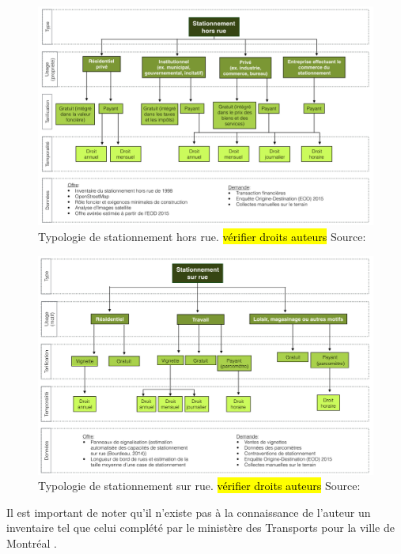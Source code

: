 \begin{figure}[ht]
    \centering
    \includegraphics[width=1.0\textwidth]{images/Typologie_Stationnement_hors_rue.png}
    \caption{Typologie de stationnement hors rue. \hl{vérifier droits auteurs} Source: \cite{Morency:StationnementDans:2017}}
    \label{fig:Typo_Stat_hors_rue}
  \end{figure}
\begin{figure}[ht]
    \centering
    \includegraphics[width=1.0\textwidth]{images/Typologie_Stationnement_sur_rue.png}
    \caption{Typologie de stationnement sur rue. \hl{vérifier droits auteurs} Source: \cite{Morency:StationnementDans:2017}}
    \label{fig:Typo_Stat_sur_rue}
\end{figure}

Il est important de noter qu'il n'existe pas à la connaissance de l'auteur un inventaire tel que celui complété par le ministère des Transports pour la ville de Montréal \parencite{ConsortiumCIMA+-DanielArbouretassocies:InventaireEspaces:1998}.

